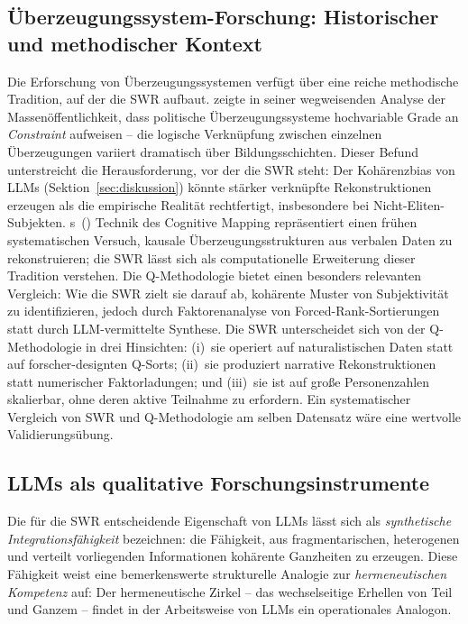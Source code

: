 \documentclass[11pt,a4paper]{article}
\theoremstyle{definition}
\theoremstyle{plain}
\theoremstyle{remark}
\begin{document}
\subsection{\"Uberzeugungssystem-Forschung: Historischer und methodischer Kontext}
\label{sec:ansaetze}

Die Erforschung von \"Uberzeugungssystemen verf\"ugt \"uber eine reiche methodische Tradition, auf der die SWR aufbaut. \citet{Converse1964} zeigte in seiner wegweisenden Analyse der Massen\"offentlichkeit, dass politische \"Uberzeugungssysteme hochvariable Grade an \emph{Constraint} aufweisen -- die logische Verkn\"upfung zwischen einzelnen \"Uberzeugungen variiert dramatisch \"uber Bildungsschichten. Dieser Befund unterstreicht die Herausforderung, vor der die SWR steht: Der \glqq Koh\"arenzbias\grqq{} von LLMs (Sektion~\ref{sec:diskussion}) k\"onnte st\"arker verkn\"upfte Rekonstruktionen erzeugen als die empirische Realit\"at rechtfertigt, insbesondere bei Nicht-Eliten-Subjekten. \citeauthor{Axelrod1976}s~(\citeyear{Axelrod1976}) Technik des Cognitive Mapping repr\"asentiert einen fr\"uhen systematischen Versuch, kausale \"Uberzeugungsstrukturen aus verbalen Daten zu rekonstruieren; die SWR l\"asst sich als computationelle Erweiterung dieser Tradition verstehen. Die Q-Methodologie \citep{Stephenson1953,Watts2012} bietet einen besonders relevanten Vergleich: Wie die SWR zielt sie darauf ab, koh\"arente Muster von Subjektivit\"at zu identifizieren, jedoch durch Faktorenanalyse von Forced-Rank-Sortierungen statt durch LLM-vermittelte Synthese. Die SWR unterscheidet sich von der Q-Methodologie in drei Hinsichten: (i)~sie operiert auf naturalistischen Daten statt auf forscher-designten Q-Sorts; (ii)~sie produziert narrative Rekonstruktionen statt numerischer Faktorladungen; und (iii)~sie ist auf gro\ss{}e Personenzahlen skalierbar, ohne deren aktive Teilnahme zu erfordern. Ein systematischer Vergleich von SWR und Q-Methodologie am selben Datensatz w\"are eine wertvolle Validierungsübung.


\subsection{LLMs als qualitative Forschungsinstrumente}
\label{sec:llm-instrumente}

Die f\"ur die SWR entscheidende Eigenschaft von LLMs l\"asst sich als \emph{synthetische Integrationsf\"ahigkeit} bezeichnen: die F\"ahigkeit, aus fragmentarischen, heterogenen und verteilt vorliegenden Informationen koh\"arente Ganzheiten zu erzeugen. Diese F\"ahigkeit weist eine bemerkenswerte strukturelle Analogie zur \emph{hermeneutischen Kompetenz} auf: Der hermeneutische Zirkel -- das wechselseitige Erhellen von Teil und Ganzem \citep{Gadamer1960} -- findet in der Arbeitsweise von LLMs ein operationales Analogon.
\end{document}
